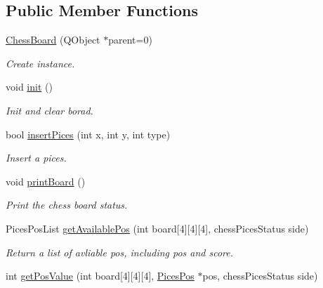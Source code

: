 \subsection*{Public Member Functions}
\begin{DoxyCompactItemize}
\item 
\hyperlink{class_chess_board_aaf5e38879e16f626b94f42cb2cb2a9f2}{Chess\+Board} (Q\+Object $\ast$parent=0)
\begin{DoxyCompactList}\small\item\em Create instance. \end{DoxyCompactList}\item 
\mbox{\label{class_chess_board_a266c0a96414a8f1605f40288a81cda60}} 
void \hyperlink{class_chess_board_a266c0a96414a8f1605f40288a81cda60}{init} ()
\begin{DoxyCompactList}\small\item\em Init and clear borad. \end{DoxyCompactList}\item 
bool \hyperlink{class_chess_board_afe130ad0f67ced921f9dacf14176cb78}{insert\+Pices} (int x, int y, int type)
\begin{DoxyCompactList}\small\item\em Insert a pices. \end{DoxyCompactList}\item 
\mbox{\label{class_chess_board_abe62b2f62c6179fb77c81b84fc17dba2}} 
void \hyperlink{class_chess_board_abe62b2f62c6179fb77c81b84fc17dba2}{print\+Board} ()
\begin{DoxyCompactList}\small\item\em Print the chess board status. \end{DoxyCompactList}\item 
Pices\+Pos\+List \hyperlink{class_chess_board_a385358d9aa201c8043e25aecd7dc93eb}{get\+Available\+Pos} (int board\mbox{[}4\mbox{]}\mbox{[}4\mbox{]}\mbox{[}4\mbox{]}, chess\+Pices\+Status side)
\begin{DoxyCompactList}\small\item\em Return a list of avliable pos, including pos and score. \end{DoxyCompactList}\item 
int \hyperlink{class_chess_board_a8208e18ec3b29a039ffe45249d4d9e53}{get\+Pos\+Value} (int board\mbox{[}4\mbox{]}\mbox{[}4\mbox{]}\mbox{[}4\mbox{]}, \hyperlink{struct_pices_pos}{Pices\+Pos} $\ast$pos, chess\+Pices\+Status side)

\end{DoxyCompactItemize}
